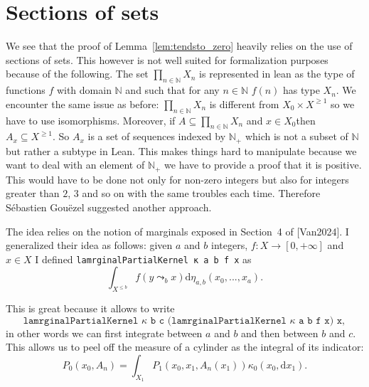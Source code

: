 \documentclass{article}
\newcommand{\lean}[1]{\lstinline[language=lean]{#1}}
\newcommand{\A}{\mathcal{A}}
\newcommand{\N}{\mathbb{N}}
\newcommand{\R}{\mathbb{R}}
\newcommand{\Xge}[1]{X^{\ge#1}}
\newcommand{\Xle}[1]{X^{\le#1}}
\newcommand{\dx}{\mathrm{d}x}
\newcommand{\dy}{\mathrm{d}y}
\newcommand{\dmu}{\mathrm{d}\mu}
\theoremstyle{definition}
\theoremstyle{remark}
\begin{document}
	\section{Sections of sets}

	We see that the proof of Lemma~\ref{lem:tendsto_zero} heavily relies on the use of sections of sets. This however is not well suited for formalization purposes because of the following. The set $\prod_{n\in\N} X_n$ is represented in lean as the type of functions $f$ with domain $\N$ and such that for any $n \in \N$ $f(n)$ has type $X_n$. We encounter the same issue as before: $\prod_{n\in\N} X_n$ is different from $X_0 \times \Xge{1}$ so we have to use isomorphisms. Moreover, if $A \subseteq \prod_{n\in\N} X_n$ and $x \in X_0$then $A_x \subseteq \Xge{1}$.
	So $A_x$ is a set of sequences indexed by $\N_+$ which is not a subset of $\N$ but rather a subtype in Lean. This makes things hard to manipulate because we want to deal with an element of $\N_+$ we have to provide a proof that it is positive. This would have to be done not only for non-zero integers but also for integers greater than $2$, $3$ and so on with the same troubles each time. Therefore Sébastien Gouëzel suggested another approach.

	The idea relies on the notion of marginals exposed in Section~4 of [Van2024]. I generalized their idea as follows: given $a$ and $b$ integers, $f : X \to [0,+\infty]$ and $x \in X$ I defined \lean{lamrginalPartialKernel κ a b f x} as
	$$\int_{\Xle{b}} f(y \leadsto_b x) \mathrm{d}\eta_{a,b}(x_0,...,x_a).$$

	This is great because it allows to write $$\texttt{lamrginalPartialKernel $\kappa$ b c (lamrginalPartialKernel $\kappa$ a b f x) x},$$
	in other words we can first integrate between $a$ and $b$ and then between $b$ and $c$. This allows us to peel off the measure of a cylinder as the integral of its indicator:
	$$P_0(x_0, A_n) = \int_{X_1} P_1(x_0, x_1, A_n(x_1)) \kappa_0(x_0,\dx_1).$$

\end{document}
